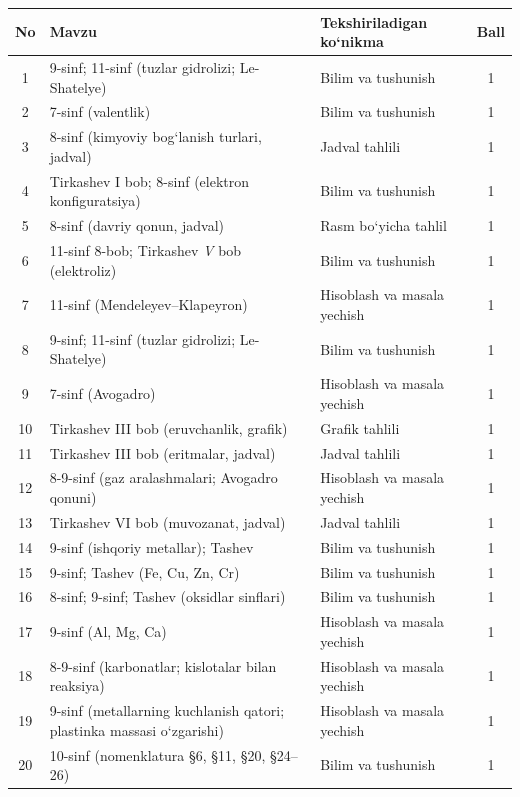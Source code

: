 \documentclass[11pt,a4paper]{article}
\begin{document}
{\small\noindent\begin{longtable}{|c|p{7.2cm}|p{5.4cm}|c|}\hline \textbf{No} & \textbf{Mavzu} & \textbf{Tekshiriladigan ko`nikma} & \textbf{Ball}\\\hline
1 & 9-sinf; 11-sinf (tuzlar gidrolizi; Le-Shatelye) & Bilim va tushunish & 1\\\hline
2 & 7-sinf (valentlik) & Bilim va tushunish & 1\\\hline
3 & 8-sinf (kimyoviy bog`lanish turlari, jadval) & Jadval tahlili & 1\\\hline
4 & Tirkashev I bob; 8-sinf (elektron konfiguratsiya) & Bilim va tushunish & 1\\\hline
5 & 8-sinf (davriy qonun, jadval) & Rasm bo`yicha tahlil & 1\\\hline
6 & 11-sinf 8-bob; Tirkashev \textit{V} bob (elektroliz) & Bilim va tushunish & 1\\\hline
7 & 11-sinf (Mendeleyev--Klapeyron) & Hisoblash va masala yechish & 1\\\hline
8 & 9-sinf; 11-sinf (tuzlar gidrolizi; Le-Shatelye) & Bilim va tushunish & 1\\\hline
9 & 7-sinf (Avogadro) & Hisoblash va masala yechish & 1\\\hline
10 & Tirkashev III bob (eruvchanlik, grafik) & Grafik tahlili & 1\\\hline
11 & Tirkashev III bob (eritmalar, jadval) & Jadval tahlili & 1\\\hline
12 & 8-9-sinf (gaz aralashmalari; Avogadro qonuni) & Hisoblash va masala yechish & 1\\\hline
13 & Tirkashev VI bob (muvozanat, jadval) & Jadval tahlili & 1\\\hline
14 & 9-sinf (ishqoriy metallar); Tashev & Bilim va tushunish & 1\\\hline
15 & 9-sinf; Tashev (Fe, Cu, Zn, Cr) & Bilim va tushunish & 1\\\hline
16 & 8-sinf; 9-sinf; Tashev (oksidlar sinflari) & Bilim va tushunish & 1\\\hline
17 & 9-sinf (Al, Mg, Ca) & Hisoblash va masala yechish & 1\\\hline
18 & 8-9-sinf (karbonatlar; kislotalar bilan reaksiya) & Hisoblash va masala yechish & 1\\\hline
19 & 9-sinf (metallarning kuchlanish qatori; plastinka massasi o`zgarishi) & Hisoblash va masala yechish & 1\\\hline
20 & 10-sinf (nomenklatura \S{}6, \S{}11, \S{}20, \S{}24--26) & Bilim va tushunish & 1\\\hline

\end{longtable}}
\end{document}
